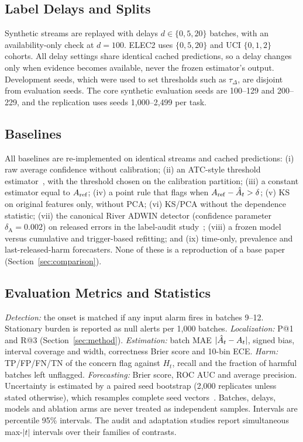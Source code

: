 \subsection{Label Delays and Splits}
Synthetic streams are replayed with delays $d\in\{0,5,20\}$ batches, with an
availability-only check at $d=100$. ELEC2 uses $\{0,5,20\}$ and UCI
$\{0,1,2\}$ cohorts. All delay settings share identical cached predictions, so a
delay changes only when evidence becomes available, never the frozen estimator's
output. Development seeds, which were used to set thresholds such as $\tau_\Delta$,
are disjoint from evaluation seeds. The core synthetic evaluation seeds are 100--129
and 200--229, and the replication uses seeds 1,000--2,499 per task.

\subsection{Baselines}
All baselines are re-implemented on identical streams and cached predictions:
(i) raw average confidence without calibration; (ii) an ATC-style threshold
estimator~\cite{garg2022atc}, with the threshold chosen on the calibration partition;
(iii) a constant estimator equal to $A_{\mathrm{ref}}$; (iv) a point rule that flags when
$A_{\mathrm{ref}}-\hat{A}_t>\delta$; (v) KS on original features only, without PCA;
(vi) KS/PCA without the dependence statistic; (vii) the canonical River ADWIN detector
(confidence parameter $\delta_{\mathrm{A}}=0.002$) on released errors in the label-audit study~\cite{bifet2007adwin};
(viii) a frozen model versus cumulative and trigger-based refitting; and (ix) time-only,
prevalence and last-released-harm forecasters. None of these is a reproduction of a
base paper (Section~\ref{sec:comparison}).

\subsection{Evaluation Metrics and Statistics}
\emph{Detection:} the onset is matched if any input alarm fires in batches 9--12.
Stationary burden is reported as null alerts per 1,000 batches.
\emph{Localization:} P@1 and R@3 (Section~\ref{sec:method}).
\emph{Estimation:} batch MAE $|\hat{A}_t-A_t|$, signed bias, interval coverage and
width, correctness Brier score and 10-bin ECE.
\emph{Harm:} TP/FP/FN/TN of the concern flag against $H_t$, recall and the fraction
of harmful batches left unflagged.
\emph{Forecasting:} Brier score, ROC AUC and average precision.
Uncertainty is estimated by a paired seed bootstrap (2,000 replicates unless stated
otherwise), which resamples complete seed vectors~\cite{efron1993bootstrap}. Batches,
delays, models and ablation arms are never treated as independent samples. Intervals
are percentile 95\% intervals. The audit and adaptation studies report simultaneous
max-$|t|$ intervals over their families of contrasts.

